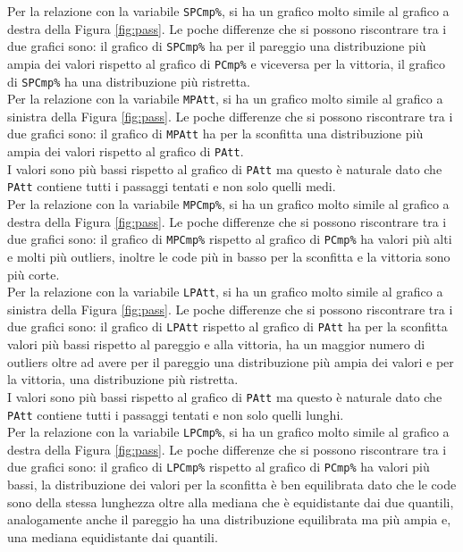 Per la relazione con la variabile \texttt{SPCmp\%}, si ha un grafico molto simile al grafico a destra della Figura \ref{fig:pass}. Le poche differenze che si possono riscontrare tra i due grafici sono: il grafico di \texttt{SPCmp\%} ha per il pareggio una distribuzione più ampia dei valori rispetto al grafico di \texttt{PCmp\%} e viceversa per la vittoria, il grafico di \texttt{SPCmp\%} ha una distribuzione più ristretta.\\

Per la relazione con la variabile \texttt{MPAtt}, si ha un grafico molto simile al grafico a sinistra della Figura \ref{fig:pass}. Le poche differenze che si possono riscontrare tra i due grafici sono: il grafico di \texttt{MPAtt} ha per la sconfitta una distribuzione più ampia dei valori rispetto al grafico di \texttt{PAtt}.\\
I valori sono più bassi rispetto al grafico di \texttt{PAtt} ma questo è naturale dato che \texttt{PAtt} contiene tutti i passaggi tentati e non solo quelli medi.\\

Per la relazione con la variabile \texttt{MPCmp\%}, si ha un grafico molto simile al grafico a destra della Figura \ref{fig:pass}. Le poche differenze che si possono riscontrare tra i due grafici sono: il grafico di \texttt{MPCmp\%} rispetto al grafico di \texttt{PCmp\%} ha valori più alti e molti più outliers, inoltre le code più in basso per la sconfitta e la vittoria sono più corte.\\

Per la relazione con la variabile \texttt{LPAtt}, si ha un grafico molto simile al grafico a sinistra della Figura \ref{fig:pass}. Le poche differenze che si possono riscontrare tra i due grafici sono: il grafico di \texttt{LPAtt} rispetto al grafico di \texttt{PAtt} ha per la sconfitta valori più bassi rispetto al pareggio e alla vittoria, ha un maggior numero di outliers oltre ad avere per il pareggio una distribuzione più ampia dei valori e per la vittoria, una distribuzione più ristretta.\\
I valori sono più bassi rispetto al grafico di \texttt{PAtt} ma questo è naturale dato che \texttt{PAtt} contiene tutti i passaggi tentati e non solo quelli lunghi.\\

Per la relazione con la variabile \texttt{LPCmp\%}, si ha un grafico molto simile al grafico a destra della Figura \ref{fig:pass}. Le poche differenze che si possono riscontrare tra i due grafici sono: il grafico di \texttt{LPCmp\%} rispetto al grafico di \texttt{PCmp\%} ha valori più bassi, la distribuzione dei valori per la sconfitta è ben equilibrata dato che le code sono della stessa lunghezza oltre alla mediana che è equidistante dai due quantili, analogamente anche il pareggio ha una distribuzione equilibrata ma più ampia e, una mediana equidistante dai quantili.\\

